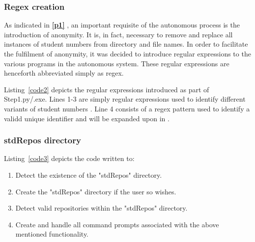 \subsubsection{Regex creation}
\label{regex1}
As indicated in \textbf{\ref{p1} }, an important requisite of the autonomous process is the introduction of anonymity. It is, in fact, necessary to remove and replace all instances of student numbers from directory and file names. In order to facilitate the fulfilment of anonymity, it was decided to introduce regular expressions to the various programs in the autonomous system. These regular expressions are henceforth abbreviated simply as regex. 



Listing~\ref{code2} depicts the regular expressions introduced as part of Step1.py/.exe. Lines 1-3 are simply regular expressions used to identify different variants of student numbers \cite{Sweigart2015}\cite{regex}. Line 4 consists of a regex pattern used to identify a validd unique identifier and will be expanded upon in \textbf{}.
\subsubsection{stdRepos directory}
\label{stdRepos}


Listing~\ref{code3} depicts the code written to:
\\
\begin{enumerate}
\item Detect the existence of the "stdRepos" directory.
\item Create the "stdRepos" directory if the user so wishes.
\item Detect valid repositories within the "stdRepos" directory.
\item Create and handle all command prompts associated with the above mentioned functionality.
\end{enumerate}

